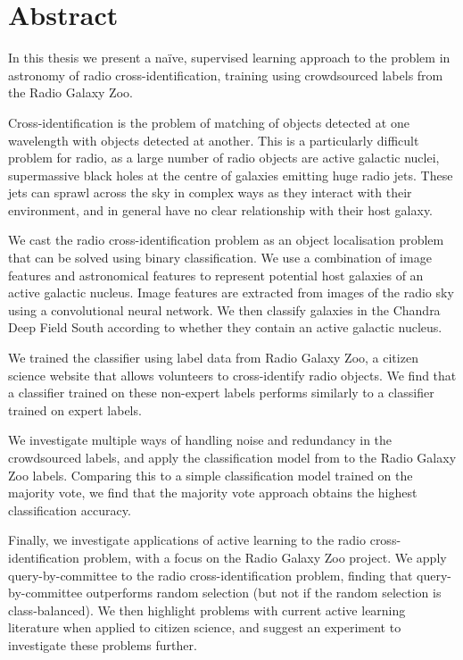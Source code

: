\chapter*{Abstract}
\label{cha:abstract}

In this thesis we present a na\"ive, supervised learning approach to the problem
in astronomy of radio cross-identification, training using crowdsourced labels
from the Radio Galaxy Zoo.

Cross-identification is the problem of matching of objects detected at one
wavelength with objects detected at another. This is a particularly difficult
problem for radio, as a large number of radio objects are active galactic
nuclei, supermassive black holes at the centre of galaxies emitting huge radio
jets. These jets can sprawl across the sky in complex ways as they interact with
their environment, and in general have no clear relationship with their host
galaxy.

We cast the radio cross-identification problem as an object localisation problem
that can be solved using binary classification. We use a combination of image
features and astronomical features to represent potential host galaxies of an
active galactic nucleus. Image features are extracted from images of the radio
sky using a convolutional neural network. We then classify galaxies in the
Chandra Deep Field South according to whether they contain an active galactic
nucleus.

We trained the classifier using label data from Radio Galaxy Zoo, a citizen
science website that allows volunteers to cross-identify radio objects. We find
that a classifier trained on these non-expert labels performs similarly to a
classifier trained on expert labels.

We investigate multiple ways of handling noise and redundancy in the
crowdsourced labels, and apply the classification model from \citet{raykar10} to
the Radio Galaxy Zoo labels. Comparing this to a simple classification model
trained on the majority vote, we find that the majority vote approach obtains
the highest classification accuracy.

Finally, we investigate applications of active learning to the radio
cross-identification problem, with a focus on the Radio Galaxy Zoo project. We
apply query-by-committee to the radio cross-identification problem, finding that
query-by-committee outperforms random selection (but not if the random selection
is class-balanced). We then highlight problems with current active learning
literature when applied to citizen science, and suggest an experiment to
investigate these problems further.
